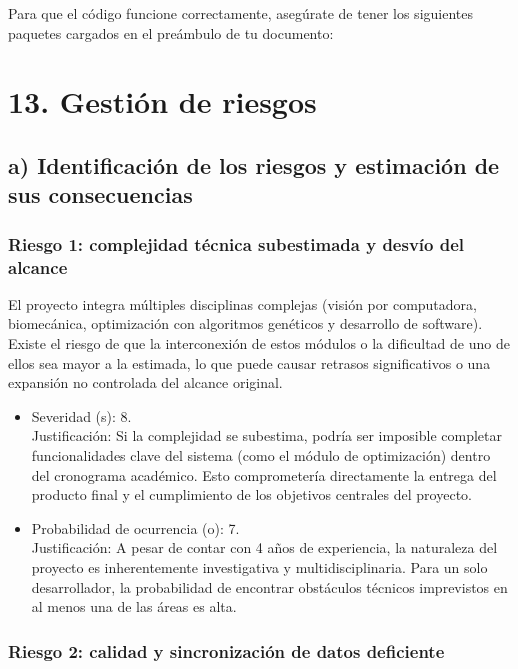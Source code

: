 \documentclass[
11pt, %
]{charter}
\begin{document}
Para que el código funcione correctamente, asegúrate de tener los siguientes paquetes cargados en el preámbulo de tu documento:


\section{13. Gestión de riesgos}
\label{sec:riesgos}

\subsection*{a) Identificación de los riesgos y estimación de sus consecuencias}

\subsubsection*{Riesgo 1: complejidad técnica subestimada y desvío del alcance}

El proyecto integra múltiples disciplinas complejas (visión por computadora, biomecánica, optimización con algoritmos genéticos y desarrollo de software). Existe el riesgo de que la interconexión de estos módulos o la dificultad de uno de ellos sea mayor a la estimada, lo que puede causar retrasos significativos o una expansión no controlada del alcance original.
\begin{itemize}
  \item Severidad (s): 8.\\
  Justificación: Si la complejidad se subestima, podría ser imposible completar funcionalidades clave del sistema (como el módulo de optimización) dentro del cronograma académico. Esto comprometería directamente la entrega del producto final y el cumplimiento de los objetivos centrales del proyecto.
  \item Probabilidad de ocurrencia (o): 7.\\
  Justificación: A pesar de contar con 4 años de experiencia, la naturaleza del proyecto es inherentemente investigativa y multidisciplinaria. Para un solo desarrollador, la probabilidad de encontrar obstáculos técnicos imprevistos en al menos una de las áreas es alta.
\end{itemize}   

\subsubsection*{Riesgo 2: calidad y sincronización de datos deficiente}
\end{document}
